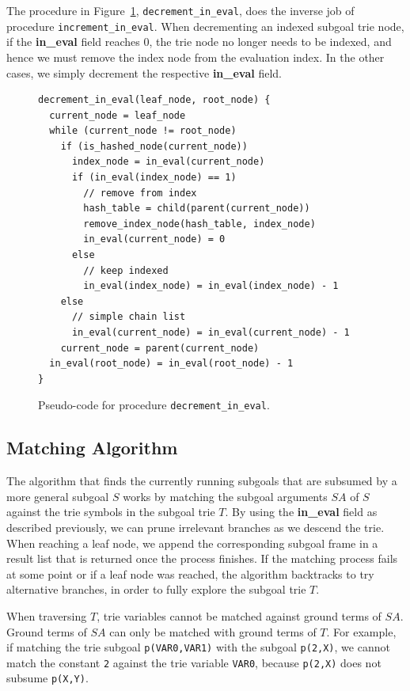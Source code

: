 The procedure in Figure~\ref{fig:decrement_in_eval},
\texttt{decrement\_in\_eval}, does the inverse job of procedure
\texttt{increment\_in\_eval}. When decrementing an indexed subgoal trie
node, if the \textbf{in\_eval} field reaches 0, the trie node no longer needs
to be indexed, and hence we must remove the index node from the
evaluation index. In the other cases, we simply decrement the
respective \textbf{in\_eval} field.

\begin{figure}[ht]
\begin{Verbatim}
decrement_in_eval(leaf_node, root_node) {
  current_node = leaf_node
  while (current_node != root_node)
    if (is_hashed_node(current_node))
      index_node = in_eval(current_node)
      if (in_eval(index_node) == 1)
        // remove from index
        hash_table = child(parent(current_node))
        remove_index_node(hash_table, index_node)
        in_eval(current_node) = 0
      else
        // keep indexed
        in_eval(index_node) = in_eval(index_node) - 1
    else
      // simple chain list
      in_eval(current_node) = in_eval(current_node) - 1
    current_node = parent(current_node)
  in_eval(root_node) = in_eval(root_node) - 1
}
\end{Verbatim}
\caption{Pseudo-code for procedure \texttt{decrement\_in\_eval}.}
\label{fig:decrement_in_eval}
\end{figure}

\subsection{Matching Algorithm}

The algorithm that finds the currently running subgoals that are
subsumed by a more general subgoal $S$ works by matching the subgoal
arguments $SA$ of $S$ against the trie symbols in the subgoal trie
$T$. By using the \textbf{in\_eval} field as described previously, we can
prune irrelevant branches as we descend the trie. When reaching a leaf
node, we append the corresponding subgoal frame in a result list that
is returned once the process finishes. If the matching process fails
at some point or if a leaf node was reached, the algorithm backtracks
to try alternative branches, in order to fully explore the subgoal
trie $T$.

When traversing $T$, trie variables cannot be matched against ground
terms of $SA$. Ground terms of $SA$ can only be matched with ground
terms of $T$. For example, if matching the trie subgoal
\texttt{p(VAR0,VAR1)} with the subgoal \texttt{p(2,X)}, we cannot match the
constant \texttt{2} against the trie variable \texttt{VAR0}, because \texttt{p(2,X)} does
not subsume \texttt{p(X,Y)}.

